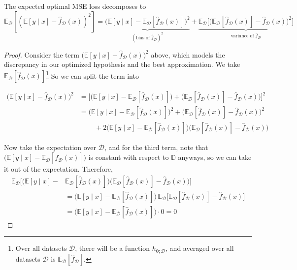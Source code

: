   \begin{theorem}
    The expected optimal MSE loss decomposes to 
    \begin{equation}
      \mathbb{E}_{\mathcal{D}} \left[ (\mathbb{E}[y \mid x] - \hat{f}_\mathcal{D} (x))^2 \right] = \underbrace{ \big( \mathbb{E}[y \mid x] - \mathbb{E}_{\mathcal{D}} [\hat{f}_\mathcal{D} (x)] \big)^2}_{(\text{bias of } \hat{f}_{\mathcal{D}})^2} + \underbrace{ \mathbb{E}_\mathcal{D} \big[ \big( \mathbb{E}_\mathcal{D} [\hat{f}_\mathcal{D} (x)] - \hat{f}_\mathcal{D} (x) \big)^2 \big]}_{\text{variance of } \hat{f}_{\mathcal{D}}}
    \end{equation}
  \end{theorem}
  \begin{proof}
    Consider the term $\big(\mathbb{E}[y \mid x] - \hat{f}_{\mathcal{D}}(x) \big)^2$ above, which models the discrepancy in our optimized hypothesis and the best approximation. We take $\mathbb{E}_{\mathcal{D}} [ \hat{f}_{\mathcal{D}} (x)]$\footnote{Over all datasets $\mathcal{D}$, there will be a function $h_{{\boldsymbol{\theta}}; \mathcal{D}}$, and averaged over all datasets $\mathcal{D}$ is $\mathbb{E}_\mathcal{D} [ \hat{f}_{\mathcal{D}}]$. } So we can split the term into 

    \begin{align}
      \big(\mathbb{E}[y \mid x] - \hat{f}_{\mathcal{D}} (x) \big)^2 & =  \big[ \big( \mathbb{E}[y \mid x] - \mathbb{E}_\mathcal{D} [\hat{f}_{\mathcal{D}} (x)] \big) + \big( \mathbb{E}_\mathcal{D} [\hat{f}_{\mathcal{D}} (x)] - \hat{f}_{\mathcal{D}} (x) \big) \big]^2 \\
      & = \big( \mathbb{E}[y \mid x] - \mathbb{E}_\mathcal{D} [\hat{f}_{\mathcal{D}} (x)] \big)^2 + \big( \mathbb{E}_\mathcal{D} [\hat{f}_{\mathcal{D}} (x)] - \hat{f}_{\mathcal{D}} (x) \big)^2 \\
      & \;\;\;\;\;\;\;\; + 2 \big( \mathbb{E}[y \mid x] - \mathbb{E}_\mathcal{D} [\hat{f}_{\mathcal{D}} (x)] \big) \big( \mathbb{E}_\mathcal{D} [\hat{f}_{\mathcal{D}} (x)] - \hat{f}_{\mathcal{D}} (x) \big) 
    \end{align}

    Now take the expectation over $\mathcal{D}$, and for the third term, note that $\big( \mathbb{E}[y \mid x] - \mathbb{E}_\mathcal{D} [\hat{f}_{\mathcal{D}} (x)] \big)$ is constant with respect to $\mathbb{D}$ anyways, so we can take it out of the expectation. Therefore, 
    \begin{align}
      \mathbb{E}_{\mathcal{D}} \big[ \big( \mathbb{E}[y \mid x] - & \mathbb{E}_\mathcal{D} [\hat{f}_{\mathcal{D}} (x)] \big) \big( \mathbb{E}_\mathcal{D} [\hat{f}_{\mathcal{D}} (x)] - \hat{f}_{\mathcal{D}} (x) \big) \big] \\
      & = \big( \mathbb{E}[y \mid x] - \mathbb{E}_\mathcal{D} [\hat{f}_{\mathcal{D}} (x)] \big) \, \mathbb{E}_{\mathcal{D}} \big[ \mathbb{E}_\mathcal{D} [\hat{f}_{\mathcal{D}} (x)] - \hat{f}_{\mathcal{D}} (x) \big] \\ 
      & = \big( \mathbb{E}[y \mid x] - \mathbb{E}_\mathcal{D} [\hat{f}_{\mathcal{D}} (x)] \big) \cdot 0 = 0
    \end{align} 
  \end{proof} 

